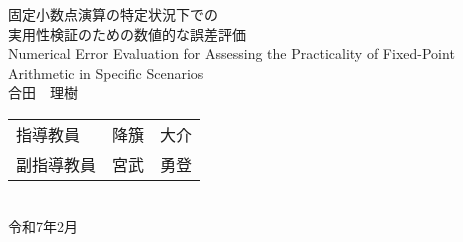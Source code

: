 \documentclass[a4paper,12pt]{ltjsreport}
\begin{document}
\begin{titlepage}
\Large
\begin{center}
\vspace*{50mm}
    {\huge 固定小数点演算の特定状況下での\\実用性検証のための数値的な誤差評価} \\
\vspace*{10mm}
    {\huge Numerical Error Evaluation for Assessing the Practicality of Fixed-Point Arithmetic in Specific Scenarios} \\
\vspace*{50mm}
合田　理樹

\vspace*{10mm}
\begin{tabular}{ll}
    指導教員 & 降籏　大介 \\
    副指導教員 & 宮武　勇登 \\
\end{tabular}
\vspace*{20mm} \\
令和7年2月 \\
\end{center}
\end{titlepage}

\tableofcontents





%











\appendix



\end{document}
